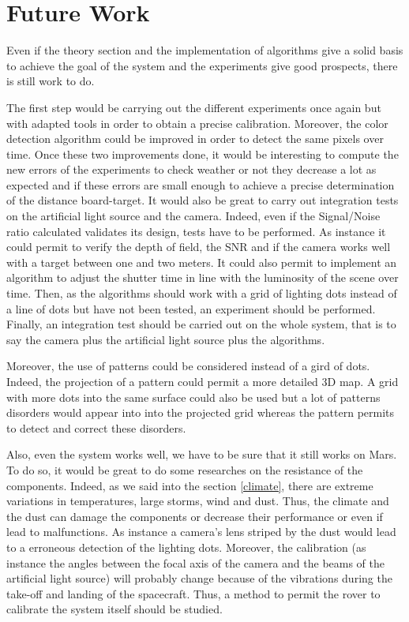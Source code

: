 \section*{Future Work}

Even if the theory section and the implementation of algorithms give a solid basis to achieve the goal of the system and the experiments give good prospects, there is still work to do.

The first step would be carrying out the different experiments once again but with adapted tools in order to obtain a precise calibration. Moreover, the color detection algorithm could be improved in order to detect the same pixels over time. Once these two improvements done, it would be interesting to compute the new errors of the experiments to check weather or not they decrease a lot as expected and if these errors are small enough to achieve a precise determination of the distance board-target. It would also be great to carry out integration tests on the artificial light source and the camera. Indeed, even if the Signal/Noise ratio calculated validates its design, tests have to be performed. As instance it could permit to verify the depth of field, the SNR and if the camera works well with a target between one and two meters. It could also permit to implement an algorithm to adjust the shutter time in line with the luminosity of the scene over time. Then, as the algorithms should work with a grid of lighting dots instead of a line of dots but have not been tested, an experiment should be performed. Finally, an integration test should be carried out on the whole system, that is to say the camera plus the artificial light source plus the algorithms.

Moreover, the use of patterns could be considered instead of a gird of dots. Indeed, the projection of a pattern could permit a more detailed 3D map. A grid with more dots into the same surface could also be used but a lot of patterns disorders would appear into into the projected grid whereas the pattern permits to detect and correct these disorders.

Also, even the system works well, we have to be sure that it still works on Mars. To do so, it would be great to do some researches on the resistance of the components. Indeed, as we said into the section \ref{climate}, there are extreme variations in temperatures, large storms, wind and dust. Thus, the climate and the dust can damage the components or decrease their performance or even if lead to malfunctions. As instance a camera's lens striped by the dust would lead to a erroneous detection of the lighting dots. Moreover, the calibration (as instance the angles between the focal axis of the camera and the beams of the artificial light source) will probably change because of the vibrations during the take-off and landing of the spacecraft. Thus, a method to permit the rover to calibrate the system itself should be studied.


